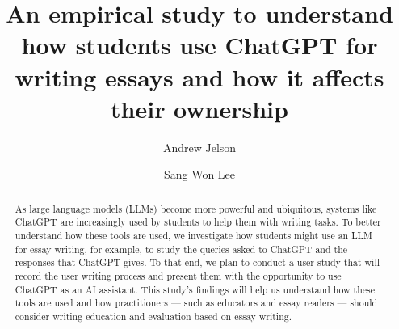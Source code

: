 \documentclass[sigconf]{acmart}
\begin{document}
\title{An empirical study to understand how students use ChatGPT for writing essays and how it affects their ownership }

\author{Andrew Jelson}

\author{Sang Won Lee}



\renewcommand{\shortauthors}{Jelson, Lee}

\begin{abstract}
As large language models (LLMs) become more powerful and ubiquitous, systems like ChatGPT are increasingly used by students to help them with writing tasks.
To better understand how these tools are used, we investigate how students might use an LLM for essay writing, for example, to study the queries asked to ChatGPT and the responses that ChatGPT gives.
To that end, we plan to conduct a user study that will record the user writing process and present them with the opportunity to use ChatGPT as an AI assistant. This study's findings will help us understand how these tools are used and how practitioners --- such as educators and essay readers --- should consider writing education and evaluation based on essay writing.

\end{abstract}

\begin{CCSXML}

\end{CCSXML}


\keywords{}
\end{document}
